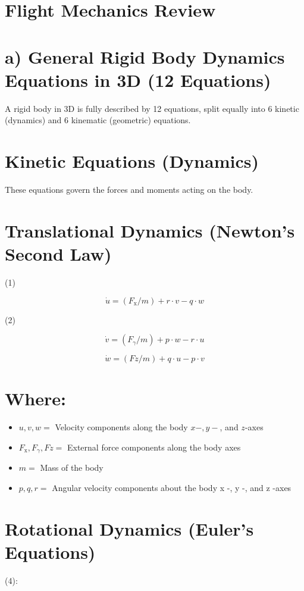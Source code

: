 \documentclass[10pt]{article}
\begin{document}
\section*{Flight Mechanics Review}
\section*{a) General Rigid Body Dynamics Equations in 3D (12 Equations)}
A rigid body in 3D is fully described by 12 equations, split equally into 6 kinetic (dynamics) and 6 kinematic (geometric) equations.

\section*{Kinetic Equations (Dynamics)}
These equations govern the forces and moments acting on the body.

\section*{Translational Dynamics (Newton's Second Law)}
(1)

$$
\dot{u}=\left(F_{\mathrm{x}} / m\right)+r \cdot v-q \cdot w
$$

(2)

$$
\dot{v}=\left(F_{\gamma} / m\right)+p \cdot w-r \cdot u
$$


\begin{equation*}
\dot{w}=(F z / m)+q \cdot u-p \cdot v \tag{3}
\end{equation*}


\section*{Where:}
\begin{itemize}
  \item $u, v, w=$ Velocity components along the body $x-, y-$, and $z$-axes
  \item $F_{\mathrm{x}}, F_{\gamma}, F z=$ External force components along the body axes
  \item $m=$ Mass of the body
  \item $p, q, r=$ Angular velocity components about the body x -, y -, and z -axes
\end{itemize}

\section*{Rotational Dynamics (Euler's Equations)}
(4):
\end{document}
